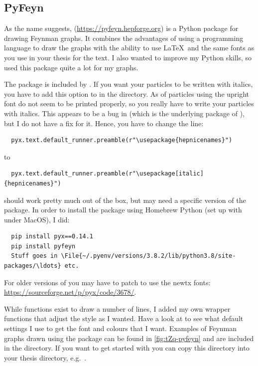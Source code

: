 \subsection{PyFeyn}%
\label{sec:fig:pyfeyn}

As the name suggests,  (\url{https://pyfeyn.hepforge.org})
is a Python package for drawing Feynman graphs.
It combines the advantages of using a programming language to draw the graphs
with the ability to use \LaTeX\ and the same fonts as you use in your thesis for the text.
I also wanted to improve my Python skills, so used this package quite a lot for my graphs.

The package  is included by .
If you want your particles to be written with italics,
you have to add this option to  in the  directory.
As of  particles using the upright font do not seem to be printed properly,
so you really have to write your particles with italics.
This appears to be a bug in  (which is the underlying package of ),
but I do not have a fix for it.
Hence, you have to change the line:
\begin{verbatim}
  pyx.text.default_runner.preamble(r"\usepackage{hepnicenames}")
\end{verbatim}
to
\begin{verbatim}
  pyx.text.default_runner.preamble(r"\usepackage[italic]{hepnicenames}")
\end{verbatim}

 should work pretty much out of the box,
but may need a specific version of the  package.
In order to install the package using Homebrew Python (set up with  under MacOS), I did:
\begin{verbatim}
  pip install pyx==0.14.1
  pip install pyfeyn
  Stuff goes in \File{~/.pyenv/versions/3.8.2/lib/python3.8/site-packages/\ldots} etc.
\end{verbatim}
For older versions of  you may have to patch 
to use the newtx fonts: \url{https://sourceforge.net/p/pyx/code/3678/}.

While functions exist to draw a number of lines, I added my own wrapper functions
that adjust the style as I wanted.
Have a look at  to see what default settings I use
to get the font and colours that I want.
Examples of Feynman graphs drawn using the package can be found in
\cref{fig:tZq-pyfeyn} and are included in the  directory.
If you want to get started with  you can copy this directory
into your thesis directory, e.g.\ .

